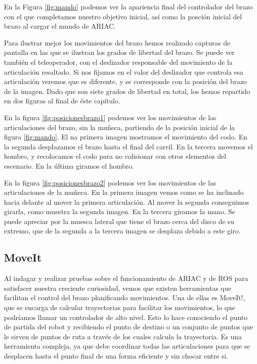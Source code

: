 En la Figura \ref{fig:mando} podemos ver la apariencia final del controlador del brazo con el que completamos nuestro objetivo inicial, así como la posción inicial del brazo al cargar el mundo de ARIAC. 

Para ilustrar mejor los movimientos del brazo hemos realizado capturas de pantalla en las que se ilustran los grados de libertad del brazo. Se puede ver también el teleoperador, con el deslizador responsable del movimiento de la articulación resaltado. Si nos fijamos en el valor del deslizador que controla esa articulación veremos que es diferente, y se corresponde con la posición del brazo de la imagen. Dado que son siete grados de libertad en total, los hemos repartido en dos figuras al final de éste capítulo. 

En la figura \ref{fig:posicionesbrazo1} podemos ver los movimientos de las articulaciones del brazo, sin la muñeca, partiendo de la posición inicial de la figura \ref{fig:mando}. El na primera imagen mostramos el movimiento del codo. En la segunda desplazamos el brazo hasta el final del carril. En la tercera movemos el hombro, y recolocamos el codo para no colisionar con otros elementos del escenario. En la última giramos el hombro.

En la figura \ref{fig:posicionesbrazo2} podemos ver los movimientos de las articulaciones de la muñeca. En la primera imagen vemos como se ha inclinado hacia delante al mover la primera articulación. Al mover la segunda conseguimos girarla, como muestra la segunda imagen. En la tercera giramos la mano. Se puede apreciar por la muesca lateral que tiene el brazo cerca del disco de su extremo, que de la segunda a la tercera imagen se desplaza debido a este giro.

\subsection{MoveIt}
\label{subsec:br_moveit}

Al indagar y realizar pruebas sobre el funcionamiento de ARIAC y de ROS para satisfacer nuestra creciente curiosidad, vemos que existen herramientas que facilitan el control del brazo planificando movimientos. Una de ellas es MoveIt!, que se encarga de calcular trayectorias para facilitar los movimientos, lo que podríamos llamar un controlador de alto nivel. Esto lo hace conociendo el punto de partida del robot y recibiendo el punto de destino o un conjunto de puntos que le sirven de puntos de ruta a través de los cuales calcula la trayectoria. Es una herramienta compleja, ya que debe coordinar todas las articulaciones para que se desplacen hasta el punto final de una forma eficiente y sin chocar entre si. 

